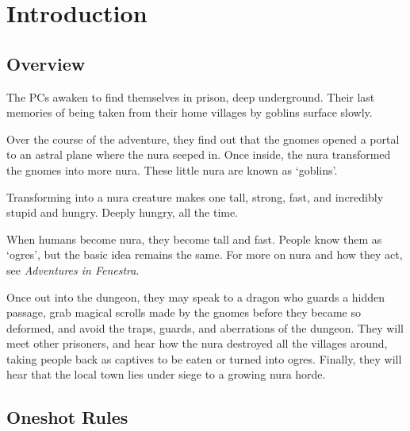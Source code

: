 \chapter{Introduction}

\section{Overview}

\begin{multicols}{2}

The PCs awaken to find themselves in prison, deep underground.
Their last memories of being taken from their home villages by goblins surface slowly.

Over the course of the adventure, they find out that the gnomes opened a portal to an astral plane where the nura seeped in.
Once inside, the nura transformed the gnomes into more nura.
These little nura are known as `goblins'.

Transforming into a nura creature makes one tall, strong, fast, and incredibly stupid and hungry.
Deeply hungry, all the time.

When humans become nura, they become tall and fast.
People know them as `ogres', but the basic idea remains the same.
For more on nura and how they act, see \textit{Adventures in Fenestra}.

Once out into the dungeon, they may speak to a dragon who guards a hidden passage, grab magical scrolls made by the gnomes before they became so deformed, and avoid the traps, guards, and aberrations of the dungeon.
They will meet other prisoners, and hear how the nura destroyed all the villages around, taking people back as captives to be eaten or turned into ogres.
Finally, they will hear that the local town lies under siege to a growing nura horde.

\end{multicols}

\section{Oneshot Rules}

